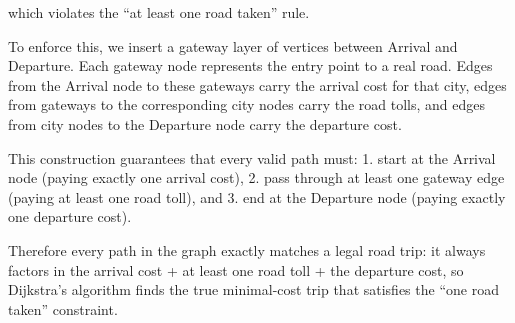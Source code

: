 \documentclass[12pt]{article}
\begin{document}
which violates the “at least one road taken” rule.

To enforce this, we insert a gateway layer of vertices between Arrival and Departure.  
Each gateway node represents the entry point to a real road.  
Edges from the Arrival node to these gateways carry the arrival cost for that city,  
edges from gateways to the corresponding city nodes carry the road tolls,  
and edges from city nodes to the Departure node carry the departure cost.

This construction guarantees that every valid path must:
1. start at the Arrival node (paying exactly one arrival cost),
2. pass through at least one gateway edge (paying at least one road toll), and
3. end at the Departure node (paying exactly one departure cost).

Therefore every path in the graph exactly matches a legal road trip:
it always factors in the arrival cost + at least one road toll + the departure cost,
so Dijkstra’s algorithm finds the true minimal-cost trip that satisfies the “one road taken” constraint.
\end{document}
